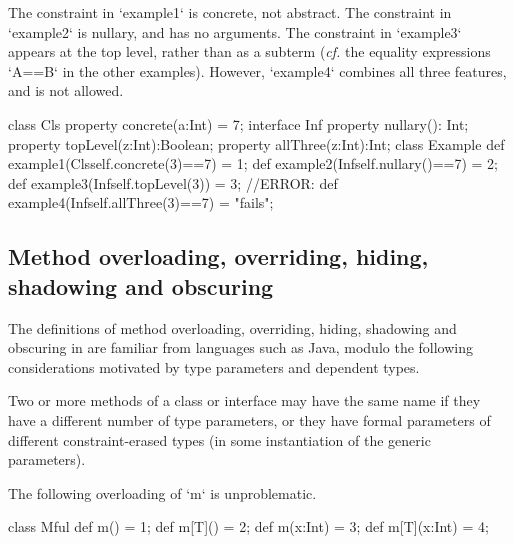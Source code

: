 \begin{ex} 
The constraint in \xcd`example1` is concrete, not abstract.  The constraint in
\xcd`example2` is nullary, and has no arguments.  The constraint in
\xcd`example3` appears at the top level, rather than as a subterm ({\em cf.}
the equality expressions \xcd`A==B` in the other examples).    However,
\xcd`example4` combines all three features, and is not allowed.
\begin{xten}
class Cls {
  property concrete(a:Int) = 7;
}
interface Inf {
  property nullary(): Int;
  property topLevel(z:Int):Boolean;
  property allThree(z:Int):Int;
}
class Example{
  def example1(Cls{self.concrete(3)==7}) = 1;
  def example2(Inf{self.nullary()==7})   = 2;
  def example3(Inf{self.topLevel(3)})    = 3;
  //ERROR: def example4(Inf{self.allThree(3)==7}) = "fails";
}
\end{xten}
%
\end{ex}


\subsection{Method overloading, overriding, hiding, shadowing and obscuring}
\label{MethodOverload}



The definitions of method overloading, overriding, hiding, shadowing and
obscuring in \Xten{} are familiar from languages such as Java, modulo the
following considerations motivated by type parameters and dependent types.



Two or more methods of a class or interface may have the same
name if they have a different number of type parameters, or
they have formal parameters of different constraint-erased types (in some instantiation of the
generic parameters). 



\begin{ex}
The following overloading of \xcd`m` is unproblematic.
\begin{xten}
class Mful{
   def m() = 1;
   def m[T]() = 2;
   def m(x:Int) = 3;
   def m[T](x:Int) = 4;
}
\end{xten}
%
\end{ex}


